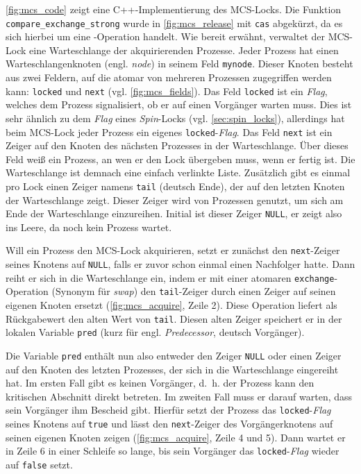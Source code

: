 \autoref{fig:mcs_code} zeigt eine C++-Implementierung des MCS-Locks.
Die Funktion\\\texttt{compare\_exchange\_strong} wurde in \autoref{fig:mcs_release} mit \texttt{cas} abgekürzt,
da es sich hierbei um eine -Operation handelt.
Wie bereit erwähnt,
verwaltet der MCS-Lock eine Warteschlange der akquirierenden Prozesse.
Jeder Prozess hat einen Warteschlangenknoten (engl. \textit{node}) in seinem Feld \texttt{mynode}.
Dieser Knoten besteht aus zwei Feldern,
auf die atomar von mehreren Prozessen zugegriffen werden kann: \texttt{locked} und \texttt{next}
(vgl. \autoref{fig:mcs_fields}).
%
Das Feld \texttt{locked} ist ein \textit{Flag},
welches dem Prozess signalisiert,
ob er auf einen Vorgänger warten muss.
Dies ist sehr ähnlich zu dem \textit{Flag} eines \textit{Spin}-Locks (vgl. \autoref{sec:spin_locks}),
allerdings hat beim MCS-Lock jeder Prozess ein eigenes \texttt{locked}-\textit{Flag}.
%
Das Feld \texttt{next} ist ein Zeiger auf den Knoten des nächsten Prozesses in der Warteschlange.
Über dieses Feld weiß ein Prozess,
an wen er den Lock übergeben muss,
wenn er fertig ist.
Die Warteschlange ist demnach eine einfach verlinkte Liste.
%
Zusätzlich gibt es einmal pro Lock einen Zeiger namens \texttt{tail} (deutsch Ende),
der auf den letzten Knoten der Warteschlange zeigt.
Dieser Zeiger wird von Prozessen genutzt,
um sich am Ende der Warteschlange einzureihen.
Initial ist dieser Zeiger \texttt{NULL},
er zeigt also ins Leere,
da noch kein Prozess wartet.

Will ein Prozess den MCS-Lock akquirieren,
setzt er zunächst den \texttt{next}-Zeiger seines Knotens auf \texttt{NULL},
falls er zuvor schon einmal einen Nachfolger hatte.
Dann reiht er sich in die Warteschlange ein,
indem er mit einer atomaren \texttt{exchange}-Operation (Synonym für \textit{swap})
den \texttt{tail}-Zeiger durch einen Zeiger auf seinen eigenen Knoten ersetzt (\autoref{fig:mcs_acquire}, Zeile 2).
Diese Operation liefert als Rückgabewert den alten Wert von \texttt{tail}.
Diesen alten Zeiger speichert er in der lokalen Variable \texttt{pred}
(kurz für engl. \textit{Predecessor}, deutsch Vorgänger).

Die Variable \texttt{pred} enthält nun also entweder den Zeiger \texttt{NULL}
oder einen Zeiger auf den Knoten des letzten Prozesses,
der sich in die Warteschlange eingereiht hat.
Im ersten Fall gibt es keinen Vorgänger,
d.~h. der Prozess kann den kritischen Abschnitt direkt betreten.
Im zweiten Fall muss er darauf warten,
dass sein Vorgänger ihm Bescheid gibt.
Hierfür setzt der Prozess das \texttt{locked}-\textit{Flag} seines Knotens auf \texttt{true}
und lässt den \texttt{next}-Zeiger des Vorgängerknotens auf seinen eigenen Knoten zeigen (\autoref{fig:mcs_acquire}, Zeile 4 und 5).
Dann wartet er in Zeile 6 in einer Schleife so lange,
bis sein Vorgänger das \texttt{locked}-\textit{Flag} wieder auf \texttt{false} setzt.

